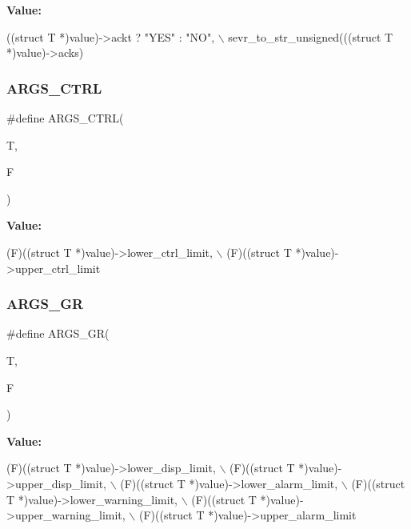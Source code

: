 {\bfseries Value\+:}
\begin{DoxyCode}
((\textcolor{keyword}{struct }T *)value)->ackt ? \textcolor{stringliteral}{"YES"} : \textcolor{stringliteral}{"NO"},   \(\backslash\)
    sevr\_to\_str\_unsigned(((\textcolor{keyword}{struct} T *)value)->acks)
\end{DoxyCode}
\mbox{\label{cuepics-world_8cpp_a8980351b4abc0732c9537704941599e9}} 
\subsubsection{A\+R\+G\+S\+\_\+\+C\+T\+RL}
{\footnotesize\ttfamily \#define A\+R\+G\+S\+\_\+\+C\+T\+RL(\begin{DoxyParamCaption}\item[{}]{T,  }\item[{}]{F }\end{DoxyParamCaption})}

{\bfseries Value\+:}
\begin{DoxyCode}
(F)((\textcolor{keyword}{struct} T *)value)->lower\_ctrl\_limit,   \(\backslash\)
    (F)((\textcolor{keyword}{struct }T *)value)->upper\_ctrl\_limit
\end{DoxyCode}
\mbox{\label{cuepics-world_8cpp_ae756576a66c8eee0f3af4872ef835f78}} 
\subsubsection{A\+R\+G\+S\+\_\+\+GR}
{\footnotesize\ttfamily \#define A\+R\+G\+S\+\_\+\+GR(\begin{DoxyParamCaption}\item[{}]{T,  }\item[{}]{F }\end{DoxyParamCaption})}

{\bfseries Value\+:}
\begin{DoxyCode}
(F)((\textcolor{keyword}{struct} T *)value)->lower\_disp\_limit,   \(\backslash\)
    (F)((\textcolor{keyword}{struct }T *)value)->upper\_disp\_limit,   \(\backslash\)
    (F)((\textcolor{keyword}{struct} T *)value)->lower\_alarm\_limit,  \(\backslash\)
    (F)((\textcolor{keyword}{struct }T *)value)->lower\_warning\_limit, \(\backslash\)
    (F)((\textcolor{keyword}{struct} T *)value)->upper\_warning\_limit, \(\backslash\)
    (F)((\textcolor{keyword}{struct }T *)value)->upper\_alarm\_limit
\end{DoxyCode}
\mbox{\label{cuepics-world_8cpp_a5991444508c9ea9a812821324d19683f}} 
